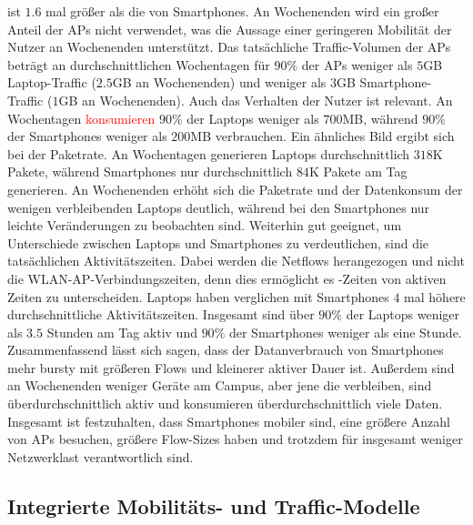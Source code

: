 \documentclass[12pt, a4paper]{article}
\begin{document}
ist $1.6$ mal größer als die von Smartphones. An Wochenenden wird ein großer Anteil der APs nicht verwendet,
was die Aussage einer geringeren Mobilität der Nutzer an Wochenenden unterstützt.
Das tatsächliche Traffic-Volumen der APs beträgt an durchschnittlichen Wochentagen für $90 \%$ der APs
weniger als $5$\textsc{GB} Laptop-Traffic ($2.5$\textsc{GB} an Wochenenden) und weniger als $3$\textsc{GB} Smartphone-Traffic
($1$\textsc{GB} an Wochenenden).
Auch das Verhalten der Nutzer ist relevant. An Wochentagen \textcolor{red}{konsumieren} $90 \%$ der Laptops weniger als $700$\textsc{MB},
während $90 \%$ der Smartphones weniger als $200$\textsc{MB} verbrauchen.
Ein ähnliches Bild ergibt sich bei der Paketrate. An Wochentagen generieren Laptops durchschnittlich $318$\textsc{K} Pakete, 
während Smartphones nur durchschnittlich $84$\textsc{K} Pakete am Tag generieren. 
An Wochenenden erhöht sich die Paketrate und der Datenkonsum der wenigen verbleibenden Laptops deutlich,
während bei den Smartphones nur leichte Veränderungen zu beobachten sind.
Weiterhin gut geeignet, um Unterschiede zwischen Laptops und Smartphones zu verdeutlichen, sind die tatsächlichen Aktivitätszeiten.
Dabei werden die Netflows herangezogen und nicht die WLAN-AP-Verbindungszeiten, denn dies ermöglicht es -Zeiten
von aktiven Zeiten zu unterscheiden. Laptops haben verglichen mit Smartphones $4$ mal höhere durchschnittliche Aktivitätszeiten.
Insgesamt sind über $90 \%$ der Laptops weniger als $3.5$ Stunden am Tag aktiv und $90 \%$ der Smartphones weniger als eine Stunde.\newline
Zusammenfassend lässt sich sagen, dass der Datanverbrauch von Smartphones mehr bursty mit größeren Flows und kleinerer aktiver
Dauer ist. Außerdem sind an Wochenenden weniger Geräte am Campus, aber jene die verbleiben, sind überdurchschnittlich aktiv 
und konsumieren überdurchschnittlich viele Daten. Insgesamt ist festzuhalten, dass Smartphones mobiler sind, 
eine größere Anzahl von APs besuchen, größere Flow-Sizes haben und trotzdem für insgesamt weniger Netzwerklast 
verantwortlich sind.

\subsection{Integrierte Mobilitäts- und Traffic-Modelle}
\end{document}
